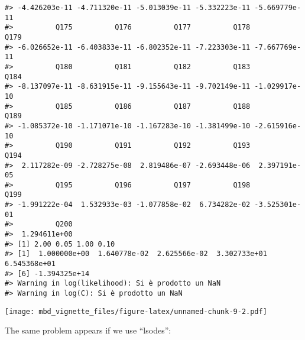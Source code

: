 \documentclass[]{article}
\begin{document}
\begin{verbatim}
#> -4.426203e-11 -4.711320e-11 -5.013039e-11 -5.332223e-11 -5.669779e-11 
#>          Q175          Q176          Q177          Q178          Q179 
#> -6.026652e-11 -6.403833e-11 -6.802352e-11 -7.223303e-11 -7.667769e-11 
#>          Q180          Q181          Q182          Q183          Q184 
#> -8.137097e-11 -8.631915e-11 -9.155643e-11 -9.702149e-11 -1.029917e-10 
#>          Q185          Q186          Q187          Q188          Q189 
#> -1.085372e-10 -1.171071e-10 -1.167283e-10 -1.381499e-10 -2.615916e-10 
#>          Q190          Q191          Q192          Q193          Q194 
#>  2.117282e-09 -2.728275e-08  2.819486e-07 -2.693448e-06  2.397191e-05 
#>          Q195          Q196          Q197          Q198          Q199 
#> -1.991222e-04  1.532933e-03 -1.077858e-02  6.734282e-02 -3.525301e-01 
#>          Q200 
#>  1.294611e+00
#> [1] 2.00 0.05 1.00 0.10
#> [1]  1.000000e+00  1.640778e-02  2.625566e-02  3.302733e+01  6.545368e+01
#> [6] -1.394325e+14
#> Warning in log(likelihood): Si è prodotto un NaN
#> Warning in log(C): Si è prodotto un NaN
\end{verbatim}

\texttt{[image: mbd\_vignette\_files/figure-latex/unnamed-chunk-9-2.pdf]}

The same problem appears if we use ``lsodes'':
\end{document}
